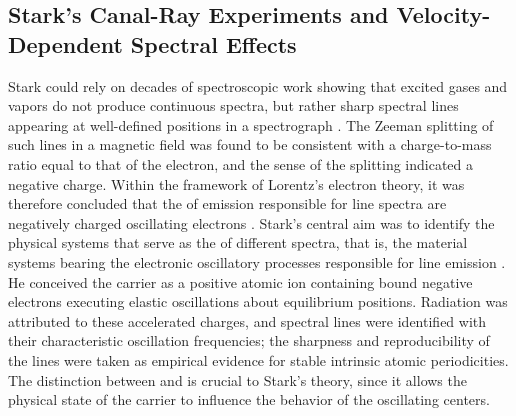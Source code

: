 \documentclass[submitted,12pt]{article} %
\providecommand{\DIFaddbegin}{} %
\providecommand{\DIFaddend}{} %
\providecommand{\DIFdelbegin}{} %
\providecommand{\DIFdelend}{} %
\begin{document}
\DIFdelbegin %
\DIFdelend \DIFaddbegin \subsection{Stark’s Canal-Ray Experiments and Velocity-Dependent Spectral Effects\label{sub:stark}}
\DIFaddend %
Stark could rely on decades of spectroscopic work showing that excited gases and vapors do not produce continuous spectra, but rather sharp spectral lines appearing at well-defined positions in a spectrograph \citep{Hentschel2002}. The Zeeman splitting of such lines in a magnetic field was found to be consistent with a charge-to-mass ratio equal to that of the electron, and the sense of the splitting indicated a negative charge. Within the framework of Lorentz’s electron theory, it was therefore concluded that the   of emission responsible for line spectra are negatively charged oscillating electrons \citep[401]{Stark1906}. Stark’s central aim was to identify the physical systems that serve as the   of different spectra, that is, the material systems bearing the electronic oscillatory processes responsible for line emission \citep[402]{Stark1906}. He conceived the carrier as a positive atomic ion containing bound negative electrons executing elastic oscillations about equilibrium positions. Radiation was attributed to these accelerated charges, and spectral lines were identified with their characteristic oscillation frequencies; the sharpness and reproducibility of the lines were taken as empirical evidence for stable intrinsic atomic periodicities. The distinction between  and  is crucial to Stark’s theory, since it allows the physical state of the carrier to influence the behavior of the oscillating centers.
\end{document}
